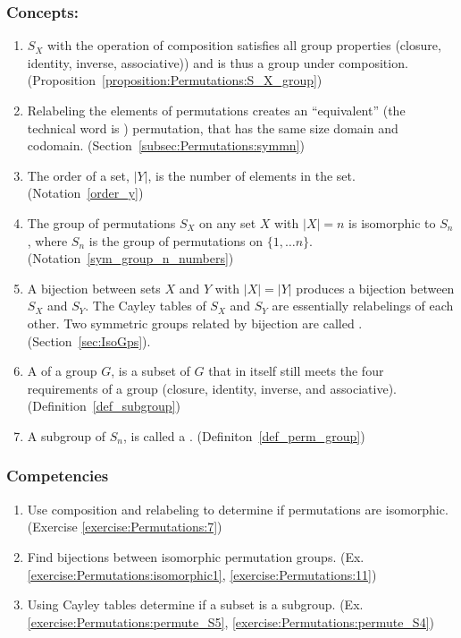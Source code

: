 \subsubsection*{Concepts:}
\begin{enumerate}
\item
$S_X$ with the operation of composition satisfies all group properties  (closure, identity, inverse, associative)) and is thus a group under composition.  (Proposition~\ref{proposition:Permutations:S_X_group})
\item
Relabeling the elements of permutations creates an ``equivalent'' (the technical word is ) permutation, that has the same size domain and codomain. (Section~\ref{subsec:Permutations:symmn})
\item
The order of a set, $|Y|$, is the number of elements in the set. (Notation~\ref{order_y})
\item
The group of permutations  $S_X$ on any set $X$ with $|X|=n$ is isomorphic to $S_n$, where $S_n$ is the group of permutations on $\{1,\ldots n\}$. (Notation~\ref{sym_group_n_numbers})
\item
A  bijection between sets $X$ and $Y$ with $|X|=|Y|$ produces a bijection between $S_X$ and $S_Y$. The Cayley tables of $S_X$ and $S_Y$ are essentially relabelings of each other.   Two symmetric groups related by bijection are called . (Section~\ref{sec:IsoGps}).  
\item
A  of a group $G$, is a subset of $G$ that in itself still meets the four requirements of a group (closure, identity, inverse, and associative). (Definition~\ref{def_subgroup})
\item
A subgroup of $S_n$,  is called a . (Definiton~\ref{def_perm_group})
\end{enumerate}

\subsubsection*{Competencies}
\begin{enumerate}
\item
Use composition and relabeling to determine if permutations are isomorphic. (Exercise \ref{exercise:Permutations:7})
\item
Find bijections between isomorphic permutation groups. (Ex. \ref{exercise:Permutations:isomorphic1}, \ref{exercise:Permutations:11})
\item
Using Cayley tables determine if a subset is a subgroup.  (Ex. \ref{exercise:Permutations:permute_S5}, \ref{exercise:Permutations:permute_S4})
\end{enumerate}


